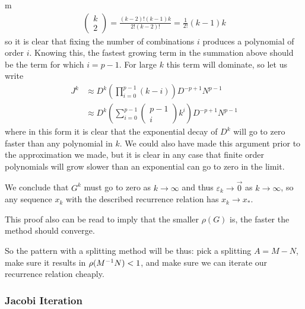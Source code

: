 \documentclass[11pt]{article}
\begin{document}
\begin{my proof}{m}
\begin{gather*}
\left( \begin{matrix} k \\ 2 \end{matrix} \right) = \frac{(k-2)!(k-1)k}{2! (k-2)!} = \frac{1}{2!} (k-1)k
\end{gather*}
so it is clear that fixing the number of combinations $i$ produces a polynomial of order $i$. Knowing this, the fastest growing term in the summation above should be the term for which $i=p-1$. For large $k$ this term will dominate, so let us write \begin{align*}
J^k &\approx D^{k} \left( \prod_{i=0}^{p-1} (k-i) \right) D^{-p+1} N^{p-1} \\
&\approx D^{k} \left( \sum_{i=0}^{p-1} \left( \begin{matrix} p-1 \\ i \end{matrix} \right) k^i \right) D^{-p+1} N^{p-1}
\end{align*}
where in this form it is clear that the exponential decay of $D^k$ will go to zero faster than any polynomial in $k$. We could also have made this argument prior to the approximation we made, but it is clear in any case that finite order polynomials will grow slower than an exponential can go to zero in the limit.

We conclude that $G^k$ must go to zero as $k \to \infty$ and thus $\varepsilon_k \to \vec 0$ as $k \to \infty$, so any sequence $x_k$ with the described recurrence relation has $x_k \to x_*$.
\end{my proof}

This proof also can be read to imply that the smaller $\rho(G)$ is, the faster the method should converge.

So the pattern with a splitting method will be thus: pick a splitting $A = M - N$, make sure it results in $\rho(M^{-1} N) < 1$, and make sure we can iterate our recurrence relation cheaply.

\subsubsection{Jacobi Iteration}
\end{document}
